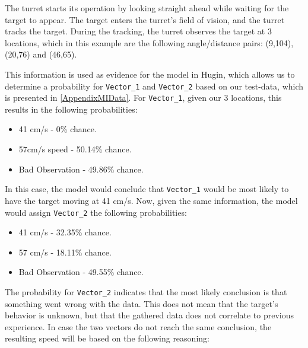 The turret starts its operation by looking straight ahead while waiting for the
target to appear. The target enters the turret's field of vision, and the turret
tracks the target. During the tracking, the turret observes the target at 3
locations, which in this example are the following angle/distance pairs:
(9,104), (20,76) and (46,65).\nl

This information is used as evidence for the model in Hugin, which allows
us to determine a probability for \texttt{Vector\_1} and \texttt{Vector\_2}
based on our test-data, which is presented in \autoref{AppendixMIData}. For
\texttt{Vector\_1}, given our 3 locations, this results in the following
probabilities:

\begin{itemize}
  \item 41 cm/s - 0\% chance.
  \item 57cm/s speed - 50.14\% chance.
  \item Bad Observation - 49.86\% chance.
\end{itemize}

In this case, the model would conclude that \texttt{Vector\_1} would be most
likely to have the target moving at 41 cm/s. Now, given the same
information, the model would assign \texttt{Vector\_2} the following probabilities:

\begin{itemize}
  \item 41 cm/s - 32.35\% chance.
  \item 57 cm/s - 18.11\% chance.
  \item Bad Observation - 49.55\% chance.
\end{itemize}

The probability for \texttt{Vector\_2} indicates that the most likely conclusion
is that something went wrong with the data. This does not mean that the target's
behavior is unknown, but that the gathered data does not correlate to previous
experience. In case the two vectors do not reach the same conclusion, the
resulting speed will be based on the following reasoning:

